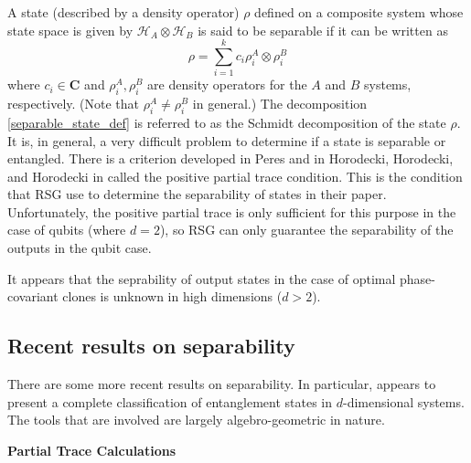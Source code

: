 \documentclass[reqno]{amsart}
\numberwithin{lemma}{section}
\numberwithin{proposition}{section}
\newcommand{\C}{\mathbf{C}}
\begin{document}
{A state (described by a density operator) $\rho$ defined on a composite system whose state space is given by $\mathcal{H}_{A} \otimes \mathcal{H}_{B}$ is said to be separable if it can be written as
\begin{equation}
\label{separable_state_def}
\rho = \sum_{i =1}^{k} c_{i} \rho_{i}^{A} \otimes \rho_{i}^{B}
\end{equation}
where $c_{i} \in \C$ and $\rho_{i}^{A}, \rho_{i}^{B}$ are density operators for the $A$ and $B$ systems, respectively. (Note that $\rho_{i}^{A} \neq \rho_{i}^{B}$ in general.) The decomposition \eqref{separable_state_def} is referred to as the Schmidt decomposition of the state $\rho$. It is, in general, a very difficult problem to determine if a state is separable or entangled. There is a criterion developed in Peres \cite{peres1996separability} and in Horodecki, Horodecki, and Horodecki in \cite{HORODECKI19961} called the positive partial trace condition. This is the condition that RSG use to determine the separability of states in their paper. Unfortunately, the positive partial trace is only sufficient for this purpose in the case of qubits (where $d=2$), so RSG can only guarantee the separability of the outputs in the qubit case.

\medskip

 It appears that the seprability of output states in the case of optimal phase-covariant clones is unknown in high dimensions ($d > 2$).

\medskip

\subsection{Recent results on separability} 
There are some more recent results on separability. In particular, \cite{Gharahi2019FinestructureCO} appears to present a complete classification of entanglement states in $d$-dimensional systems. The tools that are involved are largely algebro-geometric in nature.

\newpage

\begin{center}
\textbf{Partial Trace Calculations}
\end{center}

\medskip

}
\end{document}
